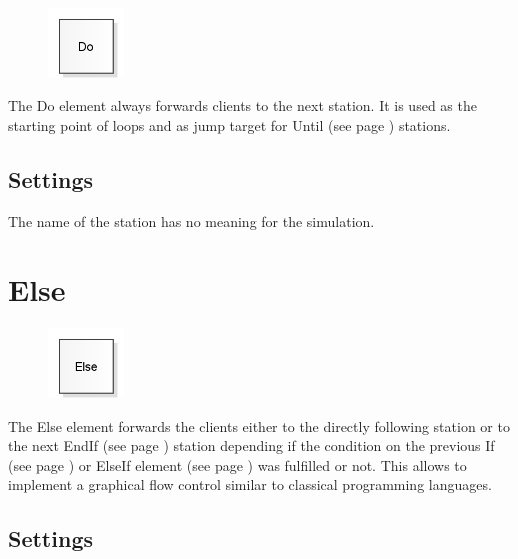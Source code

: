 \begin{figure}
\vspace{-22pt}
\includegraphics[width=2cm]{imageModelElementLogicDo.png}
\vspace{-22pt}
\end{figure}

The Do element always forwards clients to the next station.
It is used as the starting point of loops and as jump target
for Until (see page \pageref{ref:ModelElementLogicUntil}) stations.

\subsection*{Settings}

The name of the station has no meaning for the simulation.


\section{Else}
\label{ref:ModelElementLogicElse}

\begin{figure}
\vspace{-22pt}
\includegraphics[width=2cm]{imageModelElementLogicElse.png}
\vspace{-22pt}
\end{figure}

The Else element forwards the clients either to the directly following station or to the
next EndIf (see page \pageref{ref:ModelElementLogicEndIf}) station depending if the condition
on the previous If (see page \pageref{ref:ModelElementLogicIf}) or
ElseIf element (see page \pageref{ref:ModelElementLogicElseIf}) was fulfilled or not.
This allows to implement a graphical flow control similar to classical programming
languages.

\subsection*{Settings}

